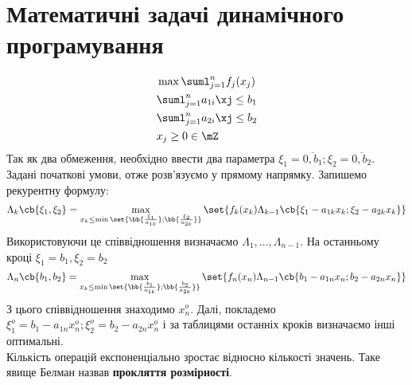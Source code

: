 \section{Математичні задачі динамічного програмування} 
\begin{eqnarray}
	&\max \suml_{j=1}^n f_j(x_j)\\
	&\suml_{j=1}^n a_{1i} \xj \leq b_1 \\
	&\suml_{j=1}^n a_{2i} \xj \leq b_2\\
	&x_j \geq 0 \in \mZ
\end{eqnarray}
Так як два обмеження, необхідно ввести два параметра $\xi_1 = \overline{0,b_1};\xi_2 = \overline{0,b_2}$. Задані початкові умови, отже розв’язуємо у прямому напрямку. Запишемо рекурентну формулу:
\begin{equation}
	\Lambda_k \cb{\xi_1,\xi_2} = \max\limits_{x_k\leq \min\set{\bb{\frac{\xi_1}{a_{1k}}};\bb{\frac{\xi_2}{a_{2k}}}} }\set{f_k(x_k) \Lambda_{k-1} \cb{ \xi_1 - a_{1k} x_k;\xi_2 - a_{2k}x_k }}
\end{equation}
Використовуючи це співвідношення визначаємо $\Lambda_1,\ldots,\Lambda_{n-1}$. На останньому кроці $\xi_1 = b_1,\xi_2=b_2$
\begin{equation}
	\Lambda_n\cb{b_1,b_2} = \max\limits_{x_k\leq \min\set{\bb{\frac{b_1}{a_{1k}}};\bb{\frac{b_2}{a_{2k}}}} }  \set{f_n(x_n) \Lambda_{n-1} \cb{b_1 - a_{1n}x_n; b_2 - a_{2n} x_n}}
\end{equation}
З цього співвідношення знаходимо $x_n^o$. Далі, покладемо $\xi_1^o = b_1 - a_{1n}x_n^o;\xi_2^o = b_2 - a_{2n} x_n^o$ і за таблицями останніх кроків визначаємо інші оптимальні.\\
Кількість операцій експоненціально зростає відносно кількості значень. Таке явище Белман назвав \textbf{прокляття розмірності}.
